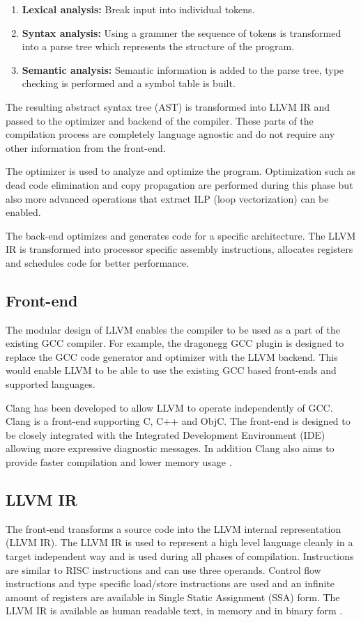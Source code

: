 \begin{enumerate}
	\item \textbf{Lexical analysis:} Break input into individual tokens.
	\item \textbf{Syntax analysis:} Using a grammer the sequence of tokens is transformed into a parse tree which represents the structure of the program.
	\item \textbf{Semantic analysis:} Semantic information is added to the parse tree, type checking is performed and a symbol table is built.
\end{enumerate}

The resulting abstract syntax tree (AST) is transformed into LLVM IR and passed to the optimizer and backend of the compiler. These parts of the compilation process are completely language agnostic and do not require any other information from the front-end.

The optimizer is used to analyze and optimize the program. Optimization such as dead code elimination and copy propagation are performed during this phase but also more advanced operations that extract ILP (loop vectorization) can be enabled.

The back-end optimizes and generates code for a specific architecture. The LLVM IR is transformed into processor specific assembly instructions, allocates registers and schedules code for better performance.

\subsection{Front-end}
The modular design of LLVM enables the compiler to be used as a part of the existing GCC compiler. For example, the dragonegg GCC plugin is designed to replace the GCC code generator and optimizer with the LLVM backend. This would enable LLVM to be able to use the existing GCC based front-ends and supported languages.

Clang has been developed to allow LLVM to operate independently of GCC. Clang is a front-end supporting C, C++ and ObjC. The front-end is designed to be closely integrated with the Integrated Development Environment (IDE) allowing more expressive diagnostic messages. In addition Clang also aims to provide faster compilation and lower memory usage \cite{clang:features}.

\subsection{LLVM IR}
The front-end transforms a source code into the LLVM internal representation (LLVM IR). The LLVM IR is used to represent a high level language cleanly in a target independent way and is used during all phases of compilation. Instructions are similar to RISC instructions and can use three operands. Control flow instructions and type specific load/store instructions are used and an infinite amount of registers are available in Single Static Assignment (SSA) form. The LLVM IR is available as human readable text, in memory and in binary form \cite{llvm:presentation}.

